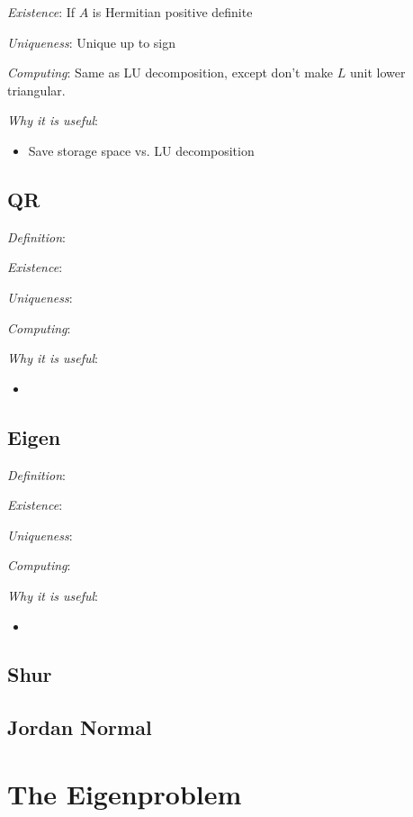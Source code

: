 \documentclass[12pt]{article}
\begin{document}
\textit{Existence}: If \( A \) is Hermitian positive definite

\textit{Uniqueness}: Unique up to sign

\textit{Computing}: Same as LU decomposition, except don't make \( L \) unit lower triangular.

\textit{Why it is useful}:
\begin{itemize}[nolistsep]
    \item Save storage space vs. LU decomposition
\end{itemize}

\subsection{QR}
\textit{Definition}:

\textit{Existence}:

\textit{Uniqueness}:

\textit{Computing}:

\textit{Why it is useful}:
\begin{itemize}[nolistsep]
    \item 
\end{itemize}



\subsection{Eigen}
\textit{Definition}:

\textit{Existence}:

\textit{Uniqueness}:

\textit{Computing}:

\textit{Why it is useful}:
\begin{itemize}[nolistsep]
    \item 
\end{itemize}

\subsection{Shur}

\subsection{Jordan Normal}

\pagebreak
\section{The Eigenproblem}
\end{document}
